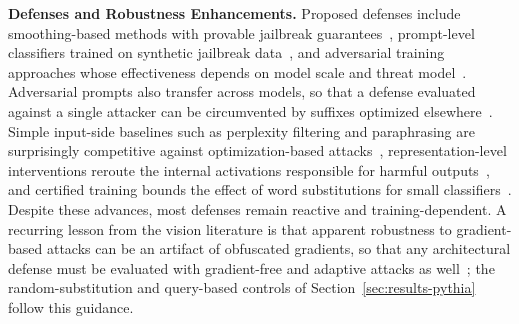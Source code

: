 \documentclass{article}
\theoremstyle{plain}
\theoremstyle{definition}
\theoremstyle{remark}
\begin{document}
\textbf{Defenses and Robustness Enhancements.}
Proposed defenses include smoothing-based methods with provable jailbreak guarantees~\citep{Robey2023SmoothLLM}, %
prompt-level classifiers trained on synthetic jailbreak data~\citep{sayeedi2025jailbreaktracer}, and adversarial training approaches whose effectiveness depends on model scale and threat model~\citep{howe2024effects}.
Adversarial prompts also transfer across models, so that a defense evaluated against a single attacker can be circumvented by suffixes optimized elsewhere~\citep{Zou2023UniversalTransferableAttacksOnAlignedLLMs}.
Simple input-side baselines such as perplexity filtering and paraphrasing are surprisingly competitive against optimization-based attacks~\citep{jain2023baseline}, representation-level interventions reroute the internal activations responsible for harmful outputs~\citep{zou2024circuit}, and certified training bounds the effect of word substitutions for small classifiers~\citep{jia2019certified}. Despite these advances, most defenses remain reactive and training-dependent. A recurring lesson from the vision literature is that apparent robustness to gradient-based attacks can be an artifact of obfuscated gradients, so that any architectural defense must be evaluated with gradient-free and adaptive attacks as well~\citep{athalye2018obfuscated,carlini2019evaluating,tramer2020adaptive}; the random-substitution and query-based controls of Section~\ref{sec:results-pythia} follow this guidance.
\end{document}
